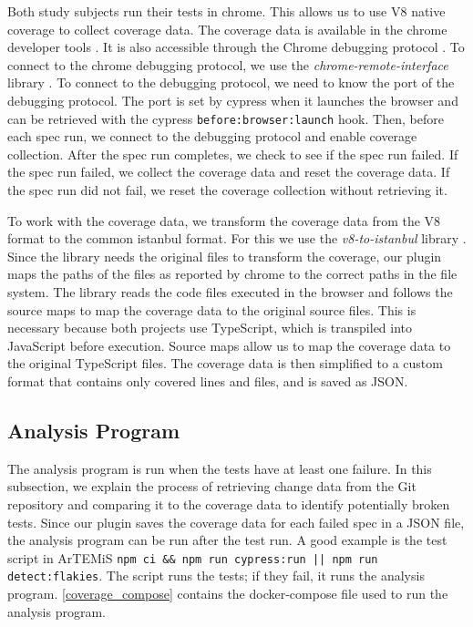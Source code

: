 Both study subjects run their tests in chrome.
This allows us to use V8 native coverage to collect coverage data.
The coverage data is available in the chrome developer tools \autocite{basques_coverage_2020}.
It is also accessible through the Chrome debugging protocol \autocite{noauthor_chrome_nodate}.
To connect to the chrome debugging protocol, we use the \emph{chrome-remote-interface} library \autocite{cardaci_chrome-remote-interface_2023}.
To connect to the debugging protocol, we need to know the port of the debugging protocol.
The port is set by cypress when it launches the browser and can be retrieved with the cypress \texttt{before:browser:launch} hook.
Then, before each spec run, we connect to the debugging protocol and enable coverage collection.
After the spec run completes, we check to see if the spec run failed.
If the spec run failed, we collect the coverage data and reset the coverage data.
If the spec run did not fail, we reset the coverage collection without retrieving it.

To work with the coverage data, we transform the coverage data from the V8 format to the common istanbul format.
For this we use the \emph{v8-to-istanbul} library \autocite{noauthor_v8--istanbul_2023}.
Since the library needs the original files to transform the coverage, our plugin maps the paths of the files as reported by chrome to the correct paths in the file system.
The library reads the code files executed in the browser and follows the source maps to map the coverage data to the original source files.
This is necessary because both projects use TypeScript, which is transpiled into JavaScript before execution.
Source maps allow us to map the coverage data to the original TypeScript files.
The coverage data is then simplified to a custom format that contains only covered lines and files, and is saved as JSON.

\subsection{Analysis Program}
The analysis program is run when the tests have at least one failure.
In this subsection, we explain the process of retrieving change data from the Git repository and comparing it to the coverage data to identify potentially broken tests.
Since our plugin saves the coverage data for each failed spec in a JSON file, the analysis program can be run after the test run.
A good example is the test script in ArTEMiS \texttt{npm ci \&\& npm run cypress:run || npm run detect:flakies}. The script runs the tests; if they fail, it runs the analysis program.
\cref{coverage_compose} contains the docker-compose file used to run the analysis program.

